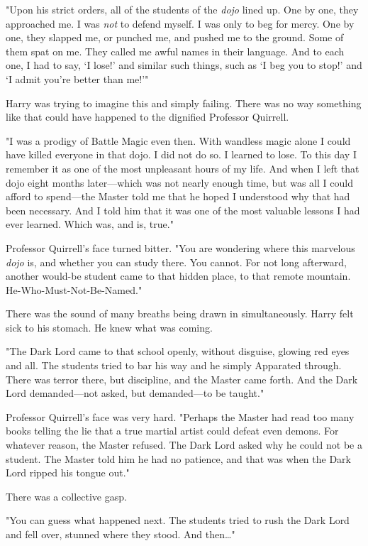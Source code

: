 "Upon his strict orders, all of the students of the \emph{dojo} lined up. One
by one, they approached me. I was \emph{not} to defend myself. I was only to
beg for mercy. One by one, they slapped me, or punched me, and pushed me to the
ground. Some of them spat on me. They called me awful names in their language.
And to each one, I had to say, `I lose!' and similar such things, such as `I
beg you to stop!' and `I admit you're better than me!'"

Harry was trying to imagine this and simply failing. There was no way something
like that could have happened to the dignified Professor Quirrell.

"I was a prodigy of Battle Magic even then. With wandless magic alone I could
have killed everyone in that dojo. I did not do so. I learned to lose. To this
day I remember it as one of the most unpleasant hours of my life. And when I
left that dojo eight months later---which was not nearly enough time, but was
all I could afford to spend---the Master told me that he hoped I understood why
that had been necessary. And I told him that it was one of the most valuable
lessons I had ever learned. Which was, and is, true."

Professor Quirrell's face turned bitter. "You are wondering where this
marvelous \emph{dojo} is, and whether you can study there. You cannot. For not
long afterward, another would-be student came to that hidden place, to that
remote mountain. He-Who-Must-Not-Be-Named."

There was the sound of many breaths being drawn in simultaneously. Harry felt
sick to his stomach. He knew what was coming.

"The Dark Lord came to that school openly, without disguise, glowing red eyes
and all. The students tried to bar his way and he simply Apparated through.
There was terror there, but discipline, and the Master came forth. And the Dark
Lord demanded---not asked, but demanded---to be taught."

Professor Quirrell's face was very hard. "Perhaps the Master had read too many
books telling the lie that a true martial artist could defeat even demons. For
whatever reason, the Master refused. The Dark Lord asked why he could not be a
student. The Master told him he had no patience, and that was when the Dark
Lord ripped his tongue out."

There was a collective gasp.

"You can guess what happened next. The students tried to rush the Dark Lord and
fell over, stunned where they stood. And then{\ldots}"

